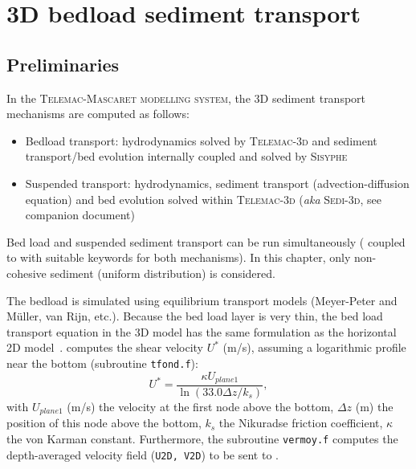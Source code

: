 \chapter[3D bedload sediment transport]{3D bedload sediment transport}\label{ch:3DBedloadTransport}

\section{Preliminaries}
In the \textsc{Telemac-Mascaret modelling system}, the 3D sediment transport mechanisms are computed as follows:

\begin{itemize}

\item Bedload transport: hydrodynamics solved by \textsc{Telemac-3d} and sediment transport/bed evolution internally coupled and solved by \textsc{Sisyphe} 

\item Suspended transport: hydrodynamics, sediment transport (advection-diffusion equation) and bed evolution solved within \textsc{Telemac-3d} (\textit{aka} \textsc{Sedi-3d}, see companion document) 

\end{itemize}

Bed load and suspended sediment transport can be run simultaneously ( coupled to \sisyphe{} with suitable keywords for both mechanisms). In this chapter, only non-cohesive sediment (uniform distribution) is considered.

The bedload is simulated using equilibrium transport models (Meyer-Peter and M\"uller, van Rijn, etc.). Because the bed load layer is very thin, the bed load transport equation in the 3D model has the same formulation as the horizontal 2D model~\cite{wu2007computational}.  computes the shear velocity $U^*$ (m/s), assuming a logarithmic profile near the bottom (subroutine \texttt{tfond.f}): 
\begin{equation*}
U^* = \frac{\kappa U_{plane 1}}{\ln \left(33.0 \Delta z / k_s\right)},
\end{equation*}
with $U_{plane 1}$ (m/s) the velocity at the first node above the bottom, $\Delta z$ (m) the position of this node above the bottom, $k_s$ the Nikuradse friction coefficient, $\kappa$ the von Karman constant. %
Furthermore, the subroutine \texttt{vermoy.f} computes the depth-averaged velocity field (\texttt{U2D, V2D}) to be sent to \sisyphe{}.

